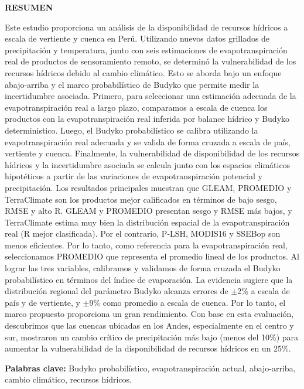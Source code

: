 \begin{center}
\large{\textbf {RESUMEN}}
\end{center}

Este estudio proporciona un análisis de la disponibilidad de recursos hídricos a escala de vertiente y cuenca en Perú. Utilizando nuevos datos grillados de precipitación y temperatura, junto con seis estimaciones de evapotranspiración real de productos de sensoramiento remoto, se determinó la vulnerabilidad de los recursos hídricos debido al cambio climático. Esto se aborda bajo un enfoque abajo-arriba y el marco probabilístico de Budyko que permite medir la incertidumbre asociada. Primero, para seleccionar una estimación adecuada de la evapotranspiración real a largo plazo, comparamos a escala de cuenca los productos con la evapotranspiración real inferida por balance hídrico y Budyko deterministico. Luego, el Budyko probabilístico se calibra utilizando la evapotranspiración real adecuada y se valida de forma cruzada a escala de país, vertiente y cuenca. Finalmente, la vulnerabilidad de disponibilidad de los recursos hídricos y la incertidumbre asociada se calcula junto con los espacios climáticos hipotéticos a partir de las variaciones de evapotranspiración potencial y precipitación. Los resultados principales muestran que GLEAM, PROMEDIO y TerraClimate son los productos mejor calificados en términos de bajo sesgo, RMSE y alto R. GLEAM y PROMEDIO presentan sesgo y RMSE más bajos, y TerraClimate estima muy bien la distribución espacial de la evapotranspiración real (R mejor clasificada). Por el contrario, P‐LSH, MODIS16 y SSEBop son menos eficientes. Por lo tanto, como referencia para la evapotranspiración real, seleccionamos PROMEDIO que representa el promedio lineal de los productos. Al lograr las tres variables, calibramos y validamos de forma cruzada el Budyko probabilístico en términos del índice de evaporación. La evidencia sugiere que la distribución regional del parámetro Budyko alcanza errores de $\pm$2\% a escala de país y de vertiente, y $\pm$9\% como promedio a escala de cuenca. Por lo tanto, el marco propuesto proporciona un gran rendimiento. Con base en esta evaluación, descubrimos que las cuencas ubicadas en los Andes, especialmente en el centro y sur, mostraron un cambio crítico de precipitación más bajo (menos del 10\%) para aumentar la vulnerabilidad de la disponibilidad de recursos hídricos en un 25\%.

\textbf {Palabras clave:} Budyko probabilístico, evapotranspiración actual, abajo-arriba, cambio climático, recursos hídricos.

